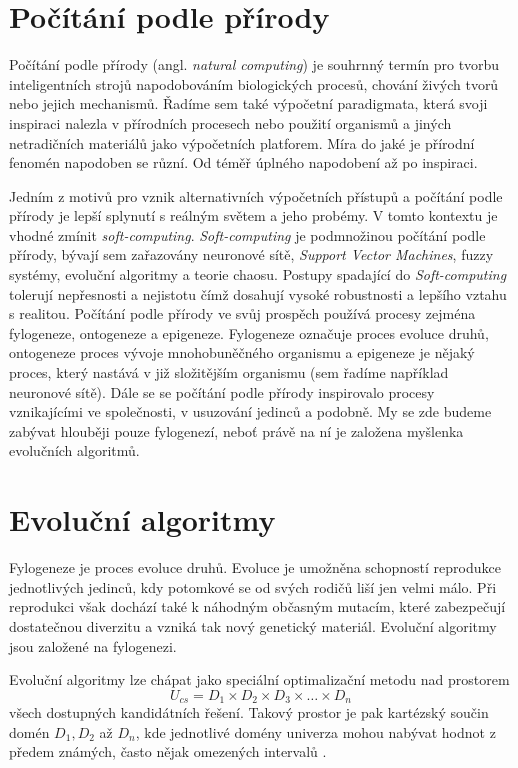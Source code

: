 \section{Počítání podle přírody}
\label{sec:natural_computing}
Počítání podle přírody (angl. \textit{natural computing}) je souhrnný termín pro tvorbu 
inteligentních strojů napodobováním biologických procesů, chování živých 
tvorů nebo jejich mechanismů. Řadíme sem také výpočetní paradigmata, která 
svoji inspiraci nalezla v přírodních procesech nebo použití organismů a 
jiných netradičních materiálů jako výpočetních platforem. Míra do jaké je 
přírodní fenomén napodoben se různí. Od téměř úplného napodobení až po 
inspiraci. 

Jedním z motivů pro vznik alternativních výpočetních přístupů a počítání 
podle přírody je lepší splynutí s reálným světem a jeho probémy.
V tomto kontextu je vhodné zmínit \textit{soft-computing}. \textit{Soft-computing}
je podmnožinou počítání podle přírody, bývají sem zařazovány 
neuronové sítě, \textit{Support Vector Machines}, fuzzy systémy, evoluční 
algoritmy a teorie chaosu. Postupy spadající do \textit{Soft-computing} 
tolerují nepřesnosti a nejistotu čímž dosahují vysoké robustnosti a 
lepšího vztahu s realitou. Počítání podle přírody ve svůj prospěch používá 
procesy zejména fylogeneze, ontogeneze a epigeneze. Fylogeneze označuje proces
evoluce druhů, ontogeneze proces vývoje mnohobuněčného organismu a epigeneze
je nějaký proces, který nastává v již složitějším organismu 
(sem řadíme například neuronové sítě).
Dále se se počítání podle přírody inspirovalo procesy vznikajícími ve společnosti, 
v usuzování jedinců a podobně. My se zde budeme zabývat hlouběji pouze fylogenezí, neboť 
právě na ní je založena myšlenka evolučních algoritmů.

\section{Evoluční algoritmy}

Fylogeneze je proces evoluce druhů. Evoluce je umožněna schopností reprodukce jednotlivých
jedinců, kdy potomkové se od svých rodičů liší jen velmi málo. Při reprodukci však dochází také
k náhodným občasným mutacím, které zabezpečují dostatečnou diverzitu a vzniká tak nový
genetický materiál. Evoluční algoritmy jsou založené na fylogenezi. 

Evoluční algoritmy lze chápat jako speciální optimalizační metodu nad prostorem 
$$U_{cs} = D_{1} \times D_{2} \times D_{3} \times \ldots \times D_{n}$$
všech dostupných kandidátních řešení. Takový prostor je pak kartézský součin domén
$D_{1}, D_{2}$ až $D_{n}$, kde jednotlivé domény univerza mohou nabývat
hodnot z předem známých, často nějak omezených intervalů \cite{evolution_hardware}.  

